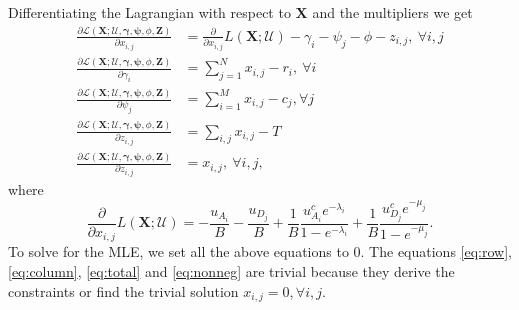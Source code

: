 \documentclass[12pt]{article}
\numberwithin{equation}{section}
\numberwithin{table}{section}
\numberwithin{figure}{section}
\newcommand{\be}{\begin{equation}}
\newcommand{\ee}{\end{equation}}
\def\bX{\mathbf{X}}
\def\bZ{\mathbf{Z}}
\def\cL{\mathcal{L}}
\def\cU{\mathcal{U}}
\def\bpsi{\boldsymbol{\psi}}
\def\bgamma{\boldsymbol{\gamma}}
\begin{document}
Differentiating the Lagrangian with respect to $\bX$ and the multipliers we get
\begin{align}
\label{eq:multipliers}
\frac{\partial \cL(\bX; \cU, \bgamma, \bpsi, \phi, \bZ)}{\partial x_{i,j}}  &= \frac{\partial}{\partial x_{i,j}} L(\bX ; \cU) - \gamma_i - \psi_j - \phi -z_{i,j},\ \forall i,j \\
\label{eq:row}
\frac{\partial \cL(\bX; \cU, \bgamma, \bpsi, \phi, \bZ)}{\partial \gamma_i}  & = \sum_{j=1}^N x_{i,j} - r_i,\ \forall i\\
\label{eq:column}
\frac{\partial \cL(\bX; \cU, \bgamma, \bpsi, \phi, \bZ)}{\partial \psi_j} & = \sum_{i=1}^M x_{i,j} - c_j, \forall j\\
\label{eq:total}
\frac{\partial \cL(\bX; \cU, \bgamma, \bpsi, \phi, \bZ)}{\partial z_{i,j}} & = \sum_{i,j} x_{i,j} - T\\
\label{eq:nonneg}
\frac{\partial \cL(\bX; \cU, \bgamma, \bpsi, \phi, \bZ)}{\partial z_{i,j}} & = x_{i,j},\ \forall i,j,
\end{align}
where
\be
\frac{\partial}{\partial x_{i,j}} L(\bX ; \cU) = - \frac{u_{A_i}}{B} - \frac{u_{D_j}}{B} + \frac{1}{B} \frac{u^c_{A_i} e^{-\lambda_i}}{1-e^{-\lambda_i}}
+ \frac{1}{B} \frac{u^c_{D_j} e^{-\mu_j}}{1-e^{-\mu_j}}.
\label{eq:diff_likelihood}
\ee
To solve for the MLE, we set all the above equations to 0. The equations \autoref{eq:row}, \autoref{eq:column}, \autoref{eq:total} and 
\autoref{eq:nonneg} are trivial because they derive the constraints or find the trivial solution $x_{i,j} = 0, \forall i,j$. 
\end{document}
